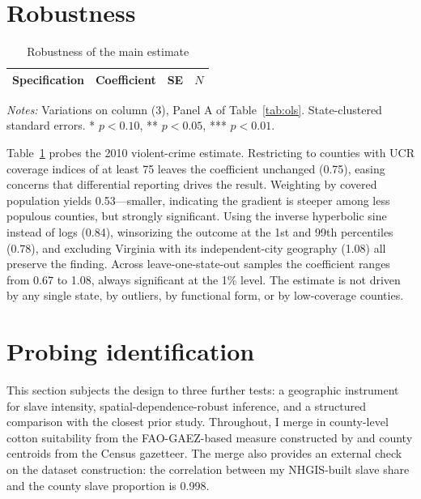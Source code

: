 \documentclass[12pt]{article}
\begin{document}
\section{Robustness}\label{sec:robust}

\begin{table}[H]
\centering
\caption{Robustness of the main estimate}
\label{tab:robust}
\begin{tabular}{lccc}
\toprule
Specification & Coefficient & SE & $N$ \\
\midrule

\bottomrule
\end{tabular}
\par\smallskip
\footnotesize\textit{Notes:} Variations on column (3), Panel A of Table~\ref{tab:ols}. State-clustered standard errors. * $p<0.10$, ** $p<0.05$, *** $p<0.01$.
\end{table}

Table~\ref{tab:robust} probes the 2010 violent-crime estimate. Restricting to counties with UCR coverage indices of at least 75 leaves the coefficient unchanged (0.75), easing concerns that differential reporting drives the result. Weighting by covered population yields 0.53---smaller, indicating the gradient is steeper among less populous counties, but strongly significant. Using the inverse hyperbolic sine instead of logs (0.84), winsorizing the outcome at the 1st and 99th percentiles (0.78), and excluding Virginia with its independent-city geography (1.08) all preserve the finding. Across leave-one-state-out samples the coefficient ranges from 0.67 to 1.08, always significant at the 1\% level. The estimate is not driven by any single state, by outliers, by functional form, or by low-coverage counties.

\section{Probing identification}\label{sec:probe}

This section subjects the design to three further tests: a geographic instrument for slave intensity, spatial-dependence-robust inference, and a structured comparison with the closest prior study. Throughout, I merge in county-level cotton suitability from the FAO-GAEZ-based measure constructed by \citet{absdata} and county centroids from the Census gazetteer. The merge also provides an external check on the dataset construction: the correlation between my NHGIS-built slave share and the \citet{abs2016} county slave proportion is 0.998.
\end{document}
